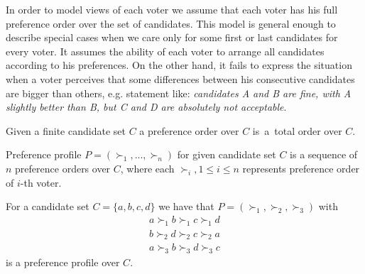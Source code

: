 In order to model views of each voter we assume that each voter has his full preference order over the set of candidates.
This model is general enough to describe special cases when we care only for some first or last candidates for every voter.
It assumes the ability of each voter to arrange all candidates according to his preferences.
On the other hand, it fails to express the situation when a voter perceives that some differences
between his consecutive candidates are bigger than others, e.g. statement like:
\textit{candidates A and B are fine, with A slightly better than B, but C and D are absolutely not acceptable}.

\begin{defn}
Given a finite candidate set $C$ a preference order over $C$
is~a~total order over $C$.
\end{defn}

\begin{defn}
Preference profile $P = (\succ_1, ... , \succ_n)$ for given candidate set $C$
is a sequence of $n$ preference orders over $C$,
where each $\succ_i, 1 \leq i \leq n$ represents preference order of $i$-th voter.
\end{defn}


\begin{exmp}
For a candidate set $C = \{a, b, c, d\}$ we have that $P = (\succ_1, \succ_2, \succ_3)$ with
\begin{align*}
a \succ_1 b \succ_1 c \succ_1 d \\
b \succ_2 d \succ_2 c \succ_2 a	\\
a \succ_3 b \succ_3 d \succ_3 c
\end{align*}
is a preference profile over $C$.
\end{exmp}